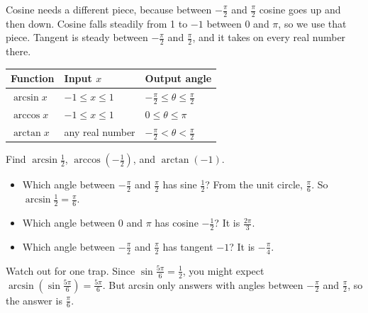 Cosine needs a different piece, because between
$-\frac{\pi}{2}$ and $\frac{\pi}{2}$ cosine goes up and then down. Cosine
falls steadily from 1 to $-1$ between $0$ and $\pi$, so we use that piece.
Tangent is steady between $-\frac{\pi}{2}$ and
$\frac{\pi}{2}$, and it takes on every real number there.

\begin{center}
\begin{tabular}{l|l|l}
Function & Input $x$ & Output angle \\
\hline
$\arcsin x$ & $-1 \le x \le 1$ & $-\frac{\pi}{2} \le \theta \le \frac{\pi}{2}$ \\
$\arccos x$ & $-1 \le x \le 1$ & $0 \le \theta \le \pi$ \\
$\arctan x$ & any real number & $-\frac{\pi}{2} < \theta < \frac{\pi}{2}$
\end{tabular}
\end{center}

\begin{Worked}
\begin{Problem}
Find $\arcsin\frac{1}{2}$, $\arccos\left(-\frac{1}{2}\right)$,
and $\arctan(-1)$.
\end{Problem}
\begin{Solution}
\begin{itemize}
\item Which angle between $-\frac{\pi}{2}$ and $\frac{\pi}{2}$ has sine
      $\frac{1}{2}$? From the unit circle, $\frac{\pi}{6}$. So
      $\arcsin\frac{1}{2} = \frac{\pi}{6}$.
\item Which angle between $0$ and $\pi$ has cosine $-\frac{1}{2}$? It is
      $\frac{2\pi}{3}$.
\item Which angle between $-\frac{\pi}{2}$ and $\frac{\pi}{2}$ has tangent
      $-1$? It is $-\frac{\pi}{4}$.
\end{itemize}
\end{Solution}
\end{Worked}

Watch out for one trap. Since $\sin\frac{5\pi}{6} = \frac{1}{2}$, you might
expect $\arcsin\left(\sin\frac{5\pi}{6}\right) = \frac{5\pi}{6}$. But
arcsin only answers with angles between $-\frac{\pi}{2}$ and
$\frac{\pi}{2}$, so the answer is $\frac{\pi}{6}$.

